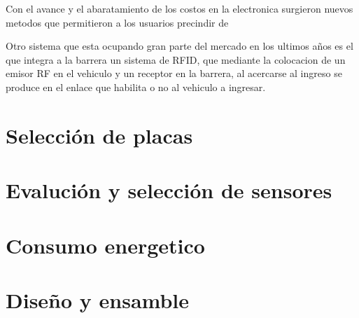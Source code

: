 Con el avance y el abaratamiento de los costos en la electronica surgieron nuevos metodos que permitieron a los usuarios
precindir de 
 
Otro sistema que esta ocupando gran parte del mercado en los ultimos años es el que integra a la barrera un sistema de 
RFID, que mediante la colocacion de un emisor RF en el vehiculo y un receptor en la barrera, al acercarse al ingreso
se produce en el enlace que habilita o no al vehiculo a ingresar.

\section{Selección de placas}

\section{Evalución y selección de sensores}

\section{Consumo energetico}

\section{Diseño y ensamble}
